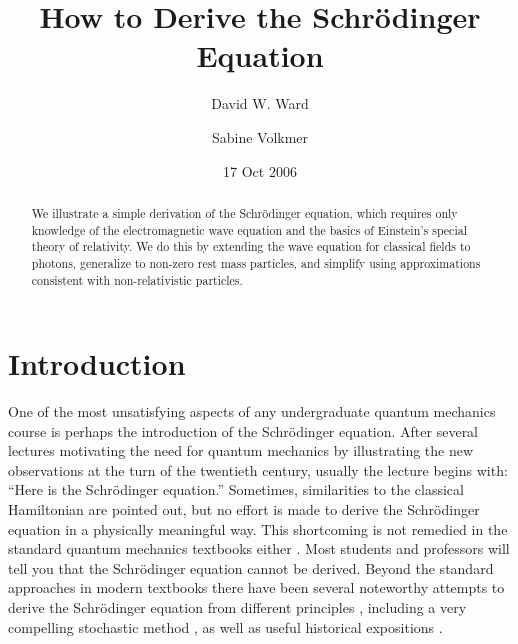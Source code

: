 \documentclass[preprint,footinbib,preprintnumbers,amsmath,amssymb,prb,12pt]{revtex4}
\begin{document}


\title{How to Derive the Schr\"{o}dinger Equation}


\author{David W. Ward}
 

\author{Sabine Volkmer}

\date{ 17 Oct 2006 }%


\begin{abstract}
We illustrate a simple derivation of the Schr\"{o}dinger equation,
which requires only knowledge of the electromagnetic wave equation
and the basics of Einstein's special theory of relativity. We do
this by extending the wave equation for classical fields to photons,
generalize to non-zero rest mass particles, and simplify using
approximations consistent with non-relativistic particles.
\end{abstract}

\maketitle

\section{Introduction}

One of the most unsatisfying aspects of any undergraduate quantum
mechanics course is perhaps the introduction of the Schr\"{o}dinger
equation. After several lectures motivating the need for quantum
mechanics by illustrating the new observations at the turn of the
twentieth century, usually the lecture begins with: ``Here is the
Schr\"{o}dinger equation.'' Sometimes, similarities to the classical
Hamiltonian are pointed out, but no effort is made to derive the
Schr\"{o}dinger equation in a physically meaningful way. This shortcoming is not remedied in the standard quantum mechanics textbooks either \cite{griffiths,merzbacher, sakurai}. Most students and professors will tell you that the Schr\"{o}dinger equation cannot be derived.  Beyond the standard approaches in modern textbooks there have been several noteworthy attempts to derive the Schr\"{o}dinger equation from different principles \cite{hall, peice, field, ogborn}, including a very compelling stochastic method \cite{nelson}, as well as useful historical expositions \cite{bernstein}.
\end{document}
